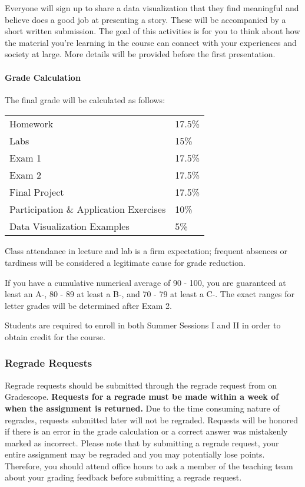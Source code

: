 \documentclass[]{article}
\let\oldparagraph\paragraph
\renewcommand{\paragraph}[1]{\oldparagraph{#1}\mbox{}}
\begin{document}
Everyone will sign up to share a data visualization that they find
meaningful and believe does a good job at presenting a story. These will
be accompanied by a short written submission. The goal of this
activities is for you to think about how the material you're learning in
the course can connect with your experiences and society at large. More
details will be provided before the first presentation.

\hypertarget{grade-calculation}{%
\paragraph{Grade Calculation}\label{grade-calculation}}

The final grade will be calculated as follows:

\begin{longtable}[]{@{}ll@{}}
\toprule
{} & {}\tabularnewline
\midrule
\endhead
Homework & 17.5\%\tabularnewline
Labs & 15\%\tabularnewline
Exam 1 & 17.5\%\tabularnewline
Exam 2 & 17.5\%\tabularnewline
Final Project & 17.5\%\tabularnewline
Participation \& Application Exercises & 10\%\tabularnewline
Data Visualization Examples & 5\%\tabularnewline
\bottomrule
\end{longtable}

Class attendance in lecture and lab is a firm expectation; frequent
absences or tardiness will be considered a legitimate cause for grade
reduction.

If you have a cumulative numerical average of 90 - 100, you are
guaranteed at least an A-, 80 - 89 at least a B-, and 70 - 79 at least a
C-. The exact ranges for letter grades will be determined after Exam 2.

Students are required to enroll in both Summer Sessions I and II in
order to obtain credit for the course.

\hypertarget{regrade-requests}{%
\subsubsection{Regrade Requests}\label{regrade-requests}}

Regrade requests should be submitted through the regrade request from on
Gradescope. \textbf{Requests for a regrade must be made within a week of
when the assignment is returned.} Due to the time consuming nature of
regrades, requests submitted later will not be regraded. Requests will
be honored if there is an error in the grade calculation or a correct
answer was mistakenly marked as incorrect. Please note that by
submitting a regrade request, your entire assignment may be regraded and
you may potentially lose points. Therefore, you should attend office
hours to ask a member of the teaching team about your grading feedback
before submitting a regrade request.
\end{document}

